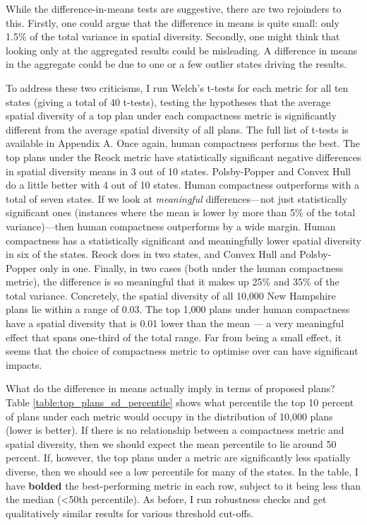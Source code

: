 \documentclass[]{article}
\begin{document}
While the difference-in-means tests are suggestive, there are two
rejoinders to this. Firstly, one could argue that the difference in
means is quite small: only 1.5\% of the total variance in spatial
diversity. Secondly, one might think that looking only at the aggregated
results could be misleading. A difference in means in the aggregate
could be due to one or a few outlier states driving the results.

To address these two criticisms, I run Welch's t-tests for each metric
for all ten states (giving a total of 40 t-tests), testing the
hypotheses that the average spatial diversity of a top plan under each
compactness metric is significantly different from the average spatial
diversity of all plans. The full list of t-tests is available in
Appendix A. Once again, human compactness performs the best. The top
plans under the Reock metric have statistically significant negative
differences in spatial diversity means in 3 out of 10 states.
Polsby-Popper and Convex Hull do a little better with 4 out of 10
states. Human compactness outperforms with a total of seven states. If
we look at \emph{meaningful} differences---not just statistically
significant ones (instances where the mean is lower by more than 5\% of
the total variance)---then human compactness outperforms by a wide
margin. Human compactness has a statistically significant and
meaningfully lower spatial diversity in six of the states. Reock does in
two states, and Convex Hull and Polsby-Popper only in one. Finally, in
two cases (both under the human compactness metric), the difference is
so meaningful that it makes up 25\% and 35\% of the total variance.
Concretely, the spatial diversity of all 10,000 New Hampshire plans lie
within a range of 0.03. The top 1,000 plans under human compactness have
a spatial diversity that is 0.01 lower than the mean --- a very
meaningful effect that spans one-third of the total range. Far from
being a small effect, it seems that the choice of compactness metric to
optimise over can have significant impacts.

What do the difference in means actually imply in terms of proposed
plans? Table \ref{table:top_plans_sd_percentile} shows what percentile
the top 10 percent of plans under each metric would occupy in the
distribution of 10,000 plans (lower is better). If there is no
relationship between a compactness metric and spatial diversity, then we
should expect the mean percentile to lie around 50 percent. If, however,
the top plans under a metric are significantly less spatially diverse,
then we should see a low percentile for many of the states. In the
table, I have \textbf{bolded} the best-performing metric in each row,
subject to it being less than the median (\textless{}50th percentile).
As before, I run robustness checks and get qualitatively similar results
for various threshold cut-offs.
\end{document}
